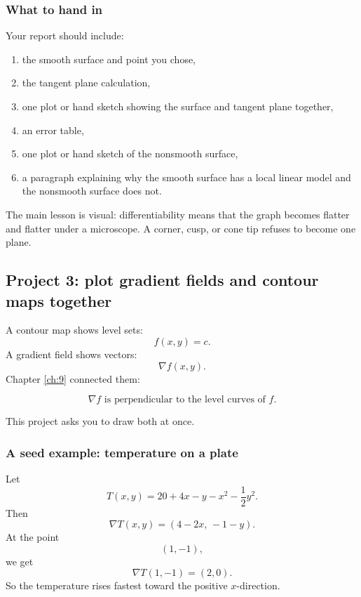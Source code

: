 \subsubsection*{What to hand in}

Your report should include:

\begin{enumerate}
\item the smooth surface and point you chose,

\item the tangent plane calculation,

\item one plot or hand sketch showing the surface and tangent plane together,

\item an error table,

\item one plot or hand sketch of the nonsmooth surface,

\item a paragraph explaining why the smooth surface has a local linear model and the
nonsmooth surface does not.
\end{enumerate}

The main lesson is visual: differentiability means that the graph becomes flatter and
flatter under a microscope.  A corner, cusp, or cone tip refuses to become one plane.

\subsection{Project 3: plot gradient fields and contour maps together}

A contour map shows level sets:
\[
    f(x,y)=c.
\]
A gradient field shows vectors:
\[
    \nabla f(x,y).
\]
Chapter \ref{ch:9} connected them:

\[
\boxed{
    \nabla f \text{ is perpendicular to the level curves of } f.
}
\]

This project asks you to draw both at once.

\subsubsection*{A seed example: temperature on a plate}

Let
\[
    T(x,y)=20+4x-y-x^2-\frac12y^2.
\]
Then
\[
    \nabla T(x,y)=(4-2x,\,-1-y).
\]
At the point
\[
    (1,-1),
\]
we get
\[
    \nabla T(1,-1)=(2,0).
\]
So the temperature rises fastest toward the positive \(x\)-direction.


